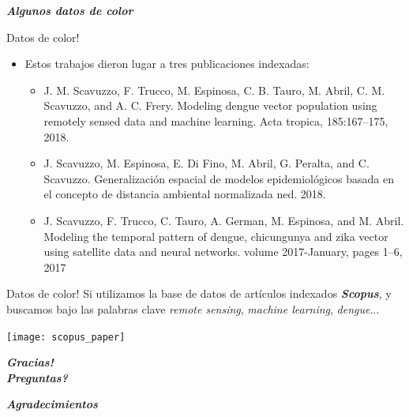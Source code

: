 \documentclass[10pt]{beamer}
\newcommand\IncrFont{\fontsize{20}{20}\selectfont}
\begin{document}
\begin{frame}{}
  \IncrFont
  \begin{center}
    \textit{\textbf{Algunos datos de color}}
  \end{center}
\end{frame}


\begin{frame}{Datos de color!}
  \begin{itemize}[<+->]
    \item Estos trabajos dieron lugar a tres publicaciones indexadas:
    \begin{itemize}
      \item J. M. Scavuzzo, F. Trucco, M. Espinosa, C. B. Tauro, M. Abril, C. M. Scavuzzo, and
      A. C. Frery. Modeling dengue vector population using remotely sensed data and machine
      learning. Acta tropica, 185:167–175, 2018.
      \item J. Scavuzzo, M. Espinosa, E. Di Fino, M. Abril, G. Peralta, and C. Scavuzzo.
      Generalización espacial de modelos epidemiológicos basada en el concepto de distancia ambiental
      normalizada ned. 2018.
      \item J. Scavuzzo, F. Trucco, C. Tauro, A. German, M. Espinosa, and M. Abril. Modeling
      the temporal pattern of dengue, chicungunya and zika vector using satellite data and
      neural networks. volume 2017-January, pages 1–6, 2017
    \end{itemize}
  \end{itemize}
\end{frame}




\begin{frame}{Datos de color!}
Si utilizamos la base de datos de artículos indexados \textit{\textbf{Scopus}},
y buscamos bajo las palabras clave \textit{remote sensing}, \textit{machine learning}, \textit{dengue}...
  \begin{center}
    \texttt{[image: scopus\_paper]}
  \end{center}

\end{frame}


\begin{frame}{}
  \IncrFont
  \begin{center}
    \textit{\textbf{Gracias! \\ Preguntas?}}
  \end{center}
\end{frame}


\begin{frame}{}
  \IncrFont
  \begin{center}
    \textit{\textbf{Agradecimientos}}
  \end{center}
\end{frame}







\appendix
\end{document}

